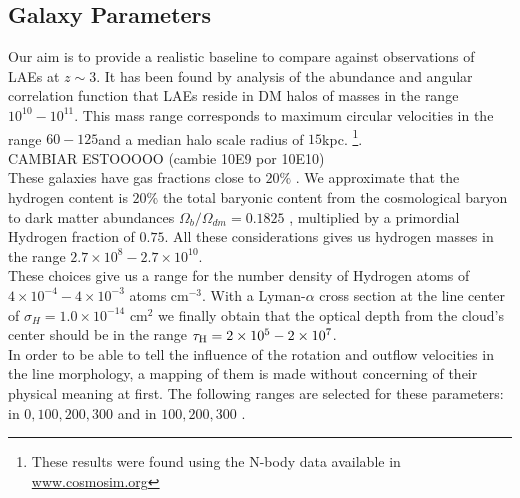 \documentclass{latex/emulateapj}
\begin{document}
\subsection{Galaxy Parameters}

Our aim is to provide a realistic baseline to compare against observations of LAEs at $z\sim 3$. It has been found by analysis of the abundance and angular correlation function that LAEs reside in DM halos of masses in the range $10^{10}-10^{11}$\Msun \cite{WalkerSoler2012}. This mass range corresponds to maximum circular velocities in the range $60-125$\kms and a median halo scale radius of $15$kpc. \footnote{These results were found using the  N-body data available in \url{www.cosmosim.org}}. \\

CAMBIAR ESTOOOOO (cambie 10E9 por 10E10)\\

These galaxies have gas fractions close to $20\%$ \citep{Narayanan2012}. We approximate that the hydrogen content is $20\%$ the total baryonic content from the cosmological baryon to dark matter  abundances $\Omega_b/\Omega_{dm}=0.1825$ \citep{Planck2015}, multiplied by a primordial Hydrogen fraction of $0.75$. All these considerations gives us hydrogen masses in the range $2.7\times 10^{8}-2.7\times 10^{10}$\Msun.\\

These choices give us a range for the number density of Hydrogen atoms of $4\times10^{-4}-4\times 10^{-3}$ atoms cm$^{-3}$. With a Lyman-$\alpha$ cross section at the line center of $\sigma_{H}=1.0\times 10^{-14}$ cm$^{2}$ we finally obtain that the optical depth from the cloud's center  should be in the range $\tau_{\rm H}=2 \times 10^{5} - 2 \times 10^{7}$.  \\

In order to be able to tell the influence of the rotation and outflow velocities in the \lya line morphology, a mapping of them is made without concerning of their physical meaning at first. The following ranges are selected for these parameters: \vrot in $0,100,200,300$ \kms and \vout in $100,200,300$ \kms.\\

\end{document}
